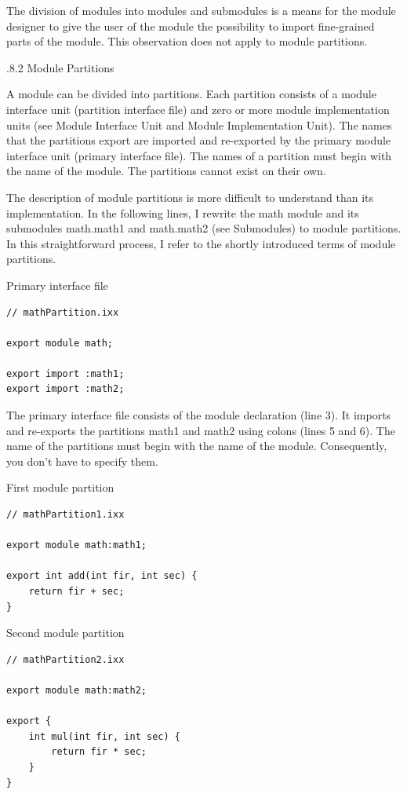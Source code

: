 The division of modules into modules and submodules is a means for the module designer to give the user of the module the possibility to import fine-grained parts of the module. This observation does not apply to module partitions.

.8.2\hspace{0.2cm} Module Partitions

A module can be divided into partitions. Each partition consists of a module interface unit (partition interface file) and zero or more module implementation units (see Module Interface Unit and Module Implementation Unit). The names that the partitions export are imported and re-exported by the primary module interface unit (primary interface file). The names of a partition must begin with the name of the module. The partitions cannot exist on their own.

The description of module partitions is more difficult to understand than its implementation. In the following lines, I rewrite the math module and its submodules math.math1 and math.math2 (see Submodules) to module partitions. In this straightforward process, I refer to the shortly introduced terms of module partitions.

\noindent
Primary interface file
\begin{lstlisting}[style=styleCXX]
// mathPartition.ixx

export module math;

export import :math1;
export import :math2;
\end{lstlisting}

The primary interface file consists of the module declaration (line 3). It imports and re-exports the partitions math1 and math2 using colons (lines 5 and 6). The name of the partitions must begin with the name of the module. Consequently, you don’t have to specify them.

\noindent
First module partition
\begin{lstlisting}[style=styleCXX]
// mathPartition1.ixx

export module math:math1;

export int add(int fir, int sec) {
	return fir + sec;
}
\end{lstlisting}

\noindent
Second module partition
\begin{lstlisting}[style=styleCXX]
// mathPartition2.ixx

export module math:math2;

export {
	int mul(int fir, int sec) {
		return fir * sec;
	}
}
\end{lstlisting}

